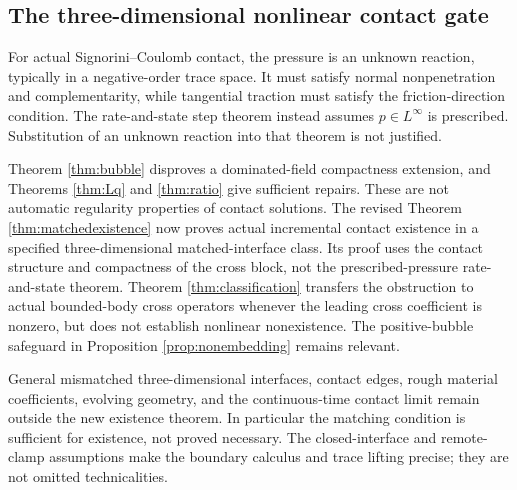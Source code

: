 \documentclass[11pt,a4paper]{article}
\theoremstyle{definition}\newtheorem{definition}[theorem]{Definition}
\theoremstyle{remark}\newtheorem{remark}[theorem]{Remark}
\numberwithin{equation}{section}
\begin{document}
\subsection{The three-dimensional nonlinear contact gate}
For actual Signorini--Coulomb contact, the pressure is an unknown reaction, typically in a negative-order trace space. It must satisfy normal nonpenetration and complementarity, while tangential traction must satisfy the friction-direction condition. The rate-and-state step theorem instead assumes $p\in L^\infty$ is prescribed. Substitution of an unknown reaction into that theorem is not justified.

Theorem \ref{thm:bubble} disproves a dominated-field compactness extension, and Theorems \ref{thm:Lq} and \ref{thm:ratio} give sufficient repairs. These are not automatic regularity properties of contact solutions. The revised Theorem \ref{thm:matchedexistence} now proves actual incremental contact existence in a specified three-dimensional matched-interface class. Its proof uses the contact structure and compactness of the cross block, not the prescribed-pressure rate-and-state theorem. Theorem \ref{thm:classification} transfers the obstruction to actual bounded-body cross operators whenever the leading cross coefficient is nonzero, but does not establish nonlinear nonexistence. The positive-bubble safeguard in Proposition \ref{prop:nonembedding} remains relevant.

General mismatched three-dimensional interfaces, contact edges, rough material coefficients, evolving geometry, and the continuous-time contact limit remain outside the new existence theorem. In particular the matching condition is sufficient for existence, not proved necessary. The closed-interface and remote-clamp assumptions make the boundary calculus and trace lifting precise; they are not omitted technicalities.
\end{document}
